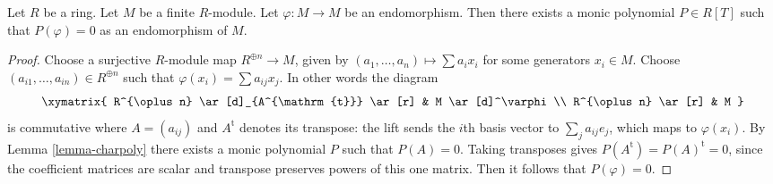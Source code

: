 \begin{lemma}
\label{lemma-charpoly-module}
Let $R$ be a ring.
Let $M$ be a finite $R$-module.
Let $\varphi : M \to M$ be an endomorphism.
Then there exists a monic polynomial $P \in R[T]$ such that
$P(\varphi) = 0$ as an endomorphism of $M$.
\end{lemma}

\begin{proof}
Choose a surjective $R$-module map $R^{\oplus n} \to M$, given by
$(a_1, \ldots, a_n) \mapsto \sum a_ix_i$ for some generators $x_i \in M$.
Choose $(a_{i1}, \ldots, a_{in}) \in R^{\oplus n}$ such that
$\varphi(x_i) = \sum a_{ij} x_j$. In other words the diagram
$$
\xymatrix{
R^{\oplus n} \ar[d]_{A^{\mathrm{t}}} \ar[r] & M \ar[d]^\varphi \\
R^{\oplus n} \ar[r] & M
}
$$
is commutative where $A = (a_{ij})$ and $A^{\mathrm{t}}$
denotes its transpose: the lift sends the $i$th basis vector to
$\sum_j a_{ij}e_j$, which maps to $\varphi(x_i)$.
By
Lemma \ref{lemma-charpoly}
there exists a monic polynomial $P$ such that $P(A) = 0$.
Taking transposes gives $P(A^{\mathrm{t}})=P(A)^{\mathrm{t}}=0$,
since the coefficient matrices are scalar and transpose preserves
powers of this one matrix.
Then it follows that $P(\varphi) = 0$.
\end{proof}